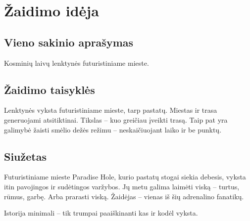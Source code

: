 \section{Žaidimo idėja}
\subsection{Vieno sakinio aprašymas}

Kosminių laivų lenktynės futuristiniame mieste.

\subsection{Žaidimo taisyklės}

Lenktynės vyksta futuristiniame mieste, tarp pastatų.
Miestas ir trasa generuojami atsitiktinai.
Tikslas -- kuo greičiau įveikti trasą.
Taip pat yra galimybė žaisti smėlio dežės režimu -- neskaičiuojant laiko ir be punktų.

\subsection{Siužetas}

Futuristiniame mieste Paradise Hole, kurio pastatų stogai siekia debesis, vyksta itin pavojingos ir sudėtingos varžybos.
Jų metu galima laimėti viską -- turtus, rūmus, garbę.
Arba prarasti viską.
Žaidėjas -- vienas iš šių adrenalino fanatikų.

Istorija minimali -- tik trumpai paaiškinanti kas ir kodėl vyksta.
